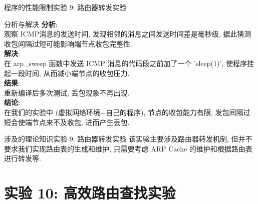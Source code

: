 \documentclass{beamer}
\begin{document}
\begin{frame}{程序的性能限制}{实验 9: 路由器转发实验}
    \begin{block}{分析与解决}
        \textbf{分析}:\\\quad 观察 ICMP消息的发送时间,
        发现相邻的消息之间发送时间差是毫秒级,
        据此猜测收包间隔过短可能影响端节点收包完整性.\\
        \textbf{解决}:\\\quad
        在 arp\_sweep 函数中发送 ICMP 消息的代码段之前加了一个
        'sleep(1)', 使程序挂起一段时间, 从而减小端节点的收包压力.\\
        \textbf{结果}:\\\quad
        重新编译后多次测试, 丢包现象不再出现.\\
        \textbf{结论}:\\\quad
        在我们的实验中 (虚拟网络环境+自己的程序),
        节点的收包能力有限, 发包间隔过短会使端节点来不及收包,
        进而产生丢包.
    \end{block}
\end{frame}


\begin{frame}{涉及的理论知识}{实验 9: 路由器转发实验}
    该实验主要涉及路由器转发机制, 但并不要求我们实现路由表的生成和维护,
    只需要考虑 ARP Cache 的维护和根据路由表进行转发等.
\end{frame}

\section{实验 10: 高效路由查找实验}
\begin{frame}
    \sectionpage
\end{frame}
\end{document}
